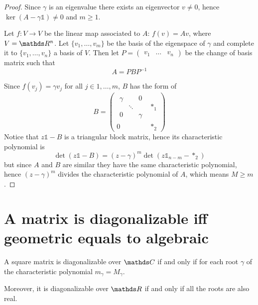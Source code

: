 \documentclass[12pt]{extarticle}
\numberwithin{equation}{section}
\begin{document}
\begin{proof}
    Since $\gamma$ is an eigenvalue there exists an eigenvector $v \neq 0$,
    hence $\ker (A - \gamma \mathds{1}) \ne 0$ and $m \geq 1$.

    Let $f: V \to V$ be the linear map associated to $A$: $f(v) = A v$, where $V = \R^n$.
    Let $\{v_1, \dots, v_m\}$ be the basis of the eigenspace of $\gamma$
    and complete it to $\{v_1, \dots, v_n\}$ a basis of $V$.
    Then let $P = \begin{pmatrix}v_1 & \dots & v_n\end{pmatrix}$ be the change of basis matrix
    such that
    \begin{equation}
        A = P B P^{-1}
    \end{equation}

    Since $f(v_j) = \gamma v_j$ for all $j \in 1, \dots, m$, $B$ has the form of
    \begin{equation}
        B = \left(\begin{array}{c|c}
            \begin{matrix}
                \gamma &        & 0      \\
                       & \ddots &        \\
                0      &        & \gamma
            \end{matrix} & *_1          \\
            \hline
            0                           & *_2
        \end{array}
        \right)
    \end{equation}
    Notice that $z \mathds{1} - B$ is a triangular block matrix, hence its characteristic polynomial is
    \begin{equation}
        \det(z \mathds 1 - B) = (z-\gamma)^m \det(z \mathds 1_{n-m} - *_2)
    \end{equation}
    but since $A$ and $B$ are similar they have the same characteristic polynomial,
    hence $(z-\gamma)^m$ divides the characteristic polynomial of $A$,
    which means $M \geq m$.
\end{proof}

\section{A matrix is diagonalizable iff geometric equals to algebraic}

\begin{theorem}{}{}
    A square matrix is diagonalizable over $\C$ if and only if
    for each root $\gamma$ of the characteristic polynomial
    $m_\gamma = M_\gamma$.

    Moreover, it is diagonalizable over $\R$ if and only if all the roots are also real.
\end{theorem}
\end{document}
